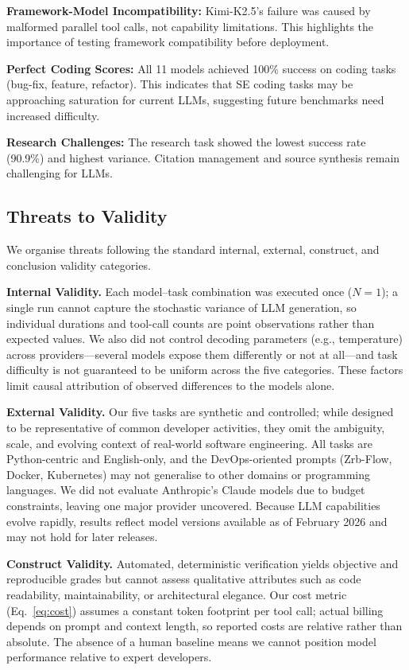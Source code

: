 \textbf{Framework-Model Incompatibility:} Kimi-K2.5's failure was caused by malformed parallel tool calls, not capability limitations. This highlights the importance of testing framework compatibility before deployment.

\textbf{Perfect Coding Scores:} All 11 models achieved 100\% success on coding tasks (bug-fix, feature, refactor). This indicates that SE coding tasks may be approaching saturation for current LLMs, suggesting future benchmarks need increased difficulty.

\textbf{Research Challenges:} The research task showed the lowest success rate (90.9\%) and highest variance. Citation management and source synthesis remain challenging for LLMs.

\subsection{Threats to Validity}
\label{sec:threats}

We organise threats following the standard internal, external, construct, and conclusion validity categories.

\textbf{Internal Validity.} Each model--task combination was executed once ($N=1$); a single run cannot capture the stochastic variance of LLM generation, so individual durations and tool-call counts are point observations rather than expected values. We also did not control decoding parameters (e.g., temperature) across providers---several models expose them differently or not at all---and task difficulty is not guaranteed to be uniform across the five categories. These factors limit causal attribution of observed differences to the models alone.

\textbf{External Validity.} Our five tasks are synthetic and controlled; while designed to be representative of common developer activities, they omit the ambiguity, scale, and evolving context of real-world software engineering. All tasks are Python-centric and English-only, and the DevOps-oriented prompts (Zrb-Flow, Docker, Kubernetes) may not generalise to other domains or programming languages. We did not evaluate Anthropic's Claude models \cite{claude3} due to budget constraints, leaving one major provider uncovered. Because LLM capabilities evolve rapidly, results reflect model versions available as of February 2026 and may not hold for later releases.

\textbf{Construct Validity.} Automated, deterministic verification yields objective and reproducible grades but cannot assess qualitative attributes such as code readability, maintainability, or architectural elegance. Our cost metric (Eq.~\ref{eq:cost}) assumes a constant token footprint per tool call; actual billing depends on prompt and context length, so reported costs are relative rather than absolute. The absence of a human baseline means we cannot position model performance relative to expert developers.

